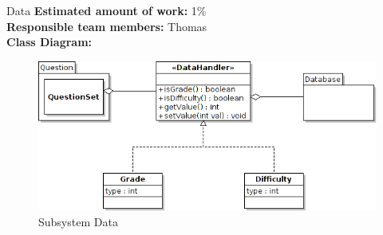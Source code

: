 \begin{subsection}{Data}
	\textbf{Estimated amount of work:} 1\% \\
	\textbf{Responsible team members:} Thomas\\
	\textbf{Class Diagram:} \\
	
	\begin{figure}[!h]
	  \centering
		\includegraphics[width=1\textwidth]{../class_diagrams/data.png}
	  \caption{Subsystem Data}
	  \label{subsystem_data}
	\end{figure}

\end{subsection}

